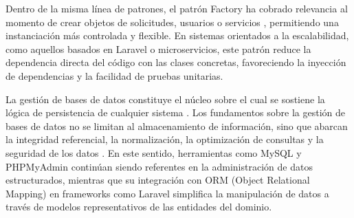 Dentro de la misma línea de patrones, el patrón Factory ha cobrado relevancia al momento de crear objetos de solicitudes, usuarios o servicios \cite{factory2018implementation}, permitiendo una instanciación más controlada y flexible. En sistemas orientados a la escalabilidad, como aquellos basados en Laravel o microservicios, este patrón reduce la dependencia directa del código con las clases concretas, favoreciendo la inyección de dependencias y la facilidad de pruebas unitarias.

La gestión de bases de datos constituye el núcleo sobre el cual se sostiene la lógica de persistencia de cualquier sistema \cite{mysql2023handbook}. Los fundamentos sobre la gestión de bases de datos no se limitan al almacenamiento de información, sino que abarcan la integridad referencial, la normalización, la optimización de consultas y la seguridad de los datos \cite{phpmyadmin2021security}. En este sentido, herramientas como MySQL y PHPMyAdmin continúan siendo referentes en la administración de datos estructurados, mientras que su integración con ORM (Object Relational Mapping) en frameworks como Laravel \cite{orm2022comparison} simplifica la manipulación de datos a través de modelos representativos de las entidades del dominio.